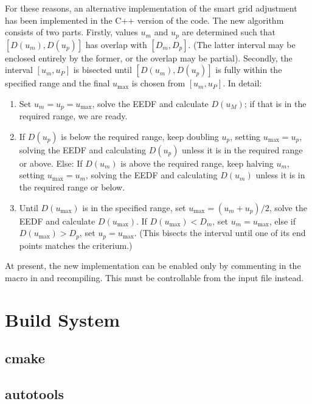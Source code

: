 \documentclass{book}
\begin{document}
For these reasons, an alternative implementation of the smart grid adjustment
has been implemented in the C++ version of the code. The new algorithm consists
of two parts. Firstly, values $u_m$ and $u_p$ are determined such that
$[D(u_m),D(u_p)]$ has overlap with $[D_m,D_p]$. (The latter interval
may be enclosed entirely by the former, or the overlap may be partial).
Secondly, the interval $[u_m,u_P]$ is bisected until $[D(u_m),D(u_p)]$
is fully within the specified range and the final $u_{\text{max}}$ is
chosen from $[u_m,u_P]$. In detail:
\begin{enumerate}
  \item Set $u_m=u_p=u_{\text{max}}$, solve the EEDF and calculate $D(u_M)$;
	if that is in the required range, we are ready.
  \item If $D(u_p)$ is below the required range, keep doubling $u_p$,
	setting $u_{\text{max}}=u_p$,
	solving the EEDF and calculating $D(u_p)$ unless it is in the
	required range or above. Else:
        If $D(u_m)$ is above the required range, keep halving $u_m$,
	setting $u_{\text{max}}=u_m$,
	solving the EEDF and calculating $D(u_m)$ unless it is in the
	required range or below.
  \item Until $D(u_{\text{max}})$ is in the specified range,
	set $u_{\text{max}}=(u_m+u_p)/2$, solve the EEDF and calculate
	$D(u_{\text{max}})$. If $D(u_{\text{max}})<D_m$,
	set $u_m=u_{\text{max}}$, else if $D(u_{\text{max}})>D_p$,
	set $u_p=u_{\text{max}}$. (This bisects the interval until
	one of its end points matches the criterium.)
\end{enumerate}
\begin{framed}
At present, the new implementation can be enabled only by
commenting in the macro 
in  and recompiling. This
must be controllable from the input file instead.
\end{framed}

\chapter{Build System}

\section{cmake}

\section{autotools}
\end{document}
